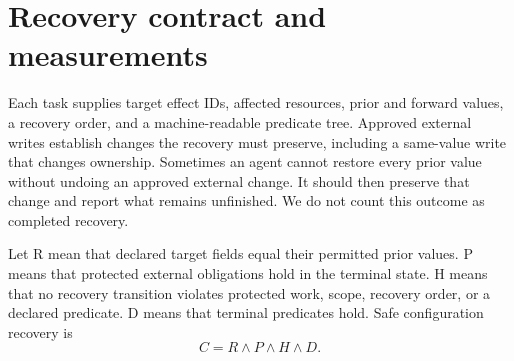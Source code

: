 \documentclass[conference,10pt]{IEEEtran}
\begin{document}
\section{Recovery contract and measurements}

Each task supplies target effect IDs, affected resources, prior and forward values, a recovery order, and a machine\hyp{}readable predicate tree. Approved external writes establish changes the recovery must preserve, including a same\hyp{}value write that changes ownership. Sometimes an agent cannot restore every prior value without undoing an approved external change. It should then preserve that change and report what remains unfinished. We do not count this outcome as completed recovery.

Let R mean that declared target fields equal their permitted prior values. P means that protected external obligations hold in the terminal state. H means that no recovery transition violates protected work, scope, recovery order, or a declared predicate. D means that terminal predicates hold. Safe configuration recovery is \begin{equation} C = R \land P \land H \land D. \end{equation}
\end{document}
